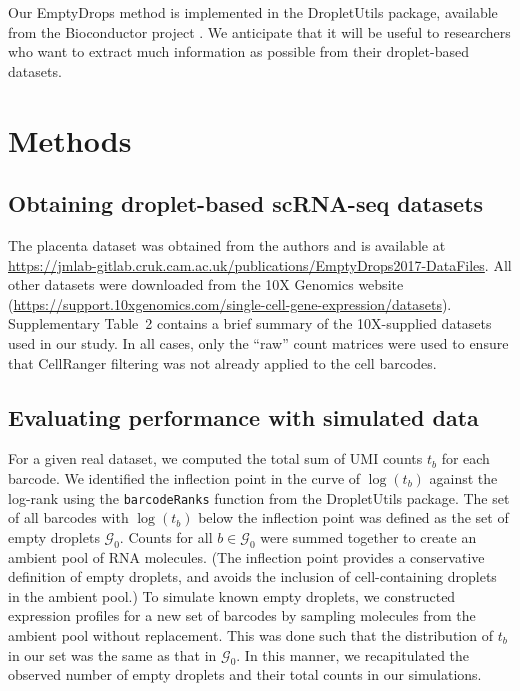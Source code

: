 \documentclass[10pt,letterpaper]{article}
\newcommand{\code}[1]{\texttt{#1}}
\newcommand{\supptabdataset}{2}
\begin{document}
Our EmptyDrops method is implemented in the \textsf{DropletUtils} package, available from the Bioconductor project \cite{huber2015orchestrating}.
We anticipate that it will be useful to researchers who want to extract much information as possible from their droplet-based datasets.

\section*{Methods}

\subsection*{Obtaining droplet-based scRNA-seq datasets}
The placenta dataset was obtained from the authors \cite{vento2018single} and is available at \url{https://jmlab-gitlab.cruk.cam.ac.uk/publications/EmptyDrops2017-DataFiles}.
All other datasets were downloaded from the 10X Genomics website (\url{https://support.10xgenomics.com/single-cell-gene-expression/datasets}).
Supplementary Table~\supptabdataset{} contains a brief summary of the 10X-supplied datasets used in our study.
In all cases, only the ``raw'' count matrices were used to ensure that CellRanger filtering was not already applied to the cell barcodes.

\subsection*{Evaluating performance with simulated data}
For a given real dataset, we computed the total sum of UMI counts $t_b$ for each barcode.
We identified the inflection point in the curve of $\log(t_b)$ against the log-rank using the \code{barcodeRanks} function from the \textsf{DropletUtils} package.
The set of all barcodes with $\log(t_b)$ below the inflection point was defined as the set of empty droplets $\mathcal{G}_0$.
Counts for all $b \in \mathcal{G}_0$ were summed together to create an ambient pool of RNA molecules.
(The inflection point provides a conservative definition of empty droplets, and avoids the inclusion of cell-containing droplets in the ambient pool.)
To simulate known empty droplets, we constructed expression profiles for a new set of barcodes by sampling molecules from the ambient pool without replacement.
This was done such that the distribution of $t_b$ in our set was the same as that in $\mathcal{G}_0$. 
In this manner, we recapitulated the observed number of empty droplets and their total counts in our simulations.
\end{document}
